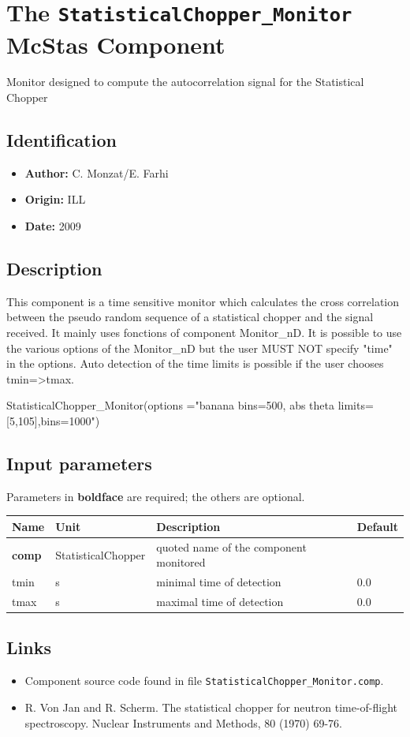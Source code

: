 \section{The \texttt{StatisticalChopper\_Monitor} McStas Component}
Monitor designed to compute the autocorrelation signal for the Statistical Chopper

\subsection*{Identification}
\begin{itemize}
  \item \textbf{Author:} C. Monzat/E. Farhi
  \item \textbf{Origin:} ILL
  \item \textbf{Date:} 2009
\end{itemize}

\subsection*{Description}
This component is a time sensitive monitor which calculates the cross correlation between the pseudo random sequence of a statistical chopper and the signal received. It mainly uses fonctions of component Monitor\_nD. It is possible to use the various options of the Monitor\_nD but the user MUST NOT specify "time" in the options. Auto detection of the time limits is possible if the user chooses tmin=\textgreater{}tmax.

StatisticalChopper\_Monitor(options ="banana bins=500, abs theta limits=[5,105],bins=1000")

\subsection*{Input parameters}
Parameters in \textbf{boldface} are required; the others are optional.

\begin{longtable}{p{}p{}p{}p{}}
\toprule
\textbf{Name} & \textbf{Unit} & \textbf{Description} & \textbf{Default} \\
\midrule
\endhead
\textbf{comp} & StatisticalChopper & quoted name of the component monitored &  \\
tmin & s & minimal time of detection & 0.0 \\
tmax & s & maximal time of detection & 0.0 \\
\bottomrule
\end{longtable}

\subsection*{Links}
\begin{itemize}
  \item Component source code found in file \texttt{StatisticalChopper\_Monitor.comp}.
  \item R. Von Jan and R. Scherm. The statistical chopper for neutron time-of-flight spectroscopy. Nuclear Instruments and Methods, 80 (1970) 69-76.
\end{itemize}
